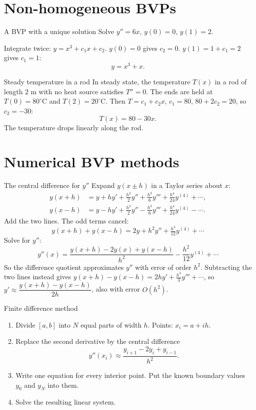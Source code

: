 \section{Non-homogeneous BVPs}

\begin{examplebox}{A BVP with a unique solution}
Solve $y'' = 6x$, \; $y(0)=0$, \; $y(1) = 2$.

Integrate twice: $y = x^3 + c_1x + c_2$. $y(0)=0$ gives $c_2=0$. $y(1)=1 + c_1 = 2$ gives $c_1=1$:
\[ y = x^3 + x. \]
\end{examplebox}

\begin{examplebox}{Steady temperature in a rod}
In steady state, the temperature $T(x)$ in a rod of length $2$ m with no heat source satisfies $T''=0$. The ends are held at $T(0)=80^\circ$C and $T(2) = 20^\circ$C. Then $T = c_1 + c_2x$, $c_1 = 80$, $80 + 2c_2 = 20$, so $c_2=-30$:
\[ T(x) = 80 - 30x . \]
The temperature drops linearly along the rod.
\end{examplebox}

\section{Numerical BVP methods}

\begin{derivbox}{The central difference for $y''$}
Expand $y(x\pm h)$ in a Taylor series about $x$:
\begin{align*}
y(x+h) &= y + hy' + \tfrac{h^2}{2}y'' + \tfrac{h^3}{6}y''' + \tfrac{h^4}{24}y^{(4)} + \cdots,\\
y(x-h) &= y - hy' + \tfrac{h^2}{2}y'' - \tfrac{h^3}{6}y''' + \tfrac{h^4}{24}y^{(4)} - \cdots.
\end{align*}
Add the two lines. The odd terms cancel:
\[ y(x+h) + y(x-h) = 2y + h^2y'' + \tfrac{h^4}{12}y^{(4)} + \cdots \]
Solve for $y''$:
\[ y''(x) = \frac{y(x+h) - 2y(x) + y(x-h)}{h^2} - \frac{h^2}{12}y^{(4)} + \cdots \]
So the difference quotient approximates $y''$ with error of order $h^2$. Subtracting the two lines instead gives $y(x+h) - y(x-h) = 2hy' + \tfrac{h^3}{3}y''' + \cdots$, so $y'\approx\dfrac{y(x+h)-y(x-h)}{2h}$, also with error $O(h^2)$.
\end{derivbox}

\begin{methodbox}{Finite difference method}
\begin{enumerate}
  \item Divide $[a,b]$ into $N$ equal parts of width $h$. Points: $x_i = a + ih$.
  \item Replace the second derivative by the central difference
  \[ y''(x_i) \approx \frac{y_{i+1} - 2y_i + y_{i-1}}{h^2}. \]
  \item Write one equation for every interior point. Put the known boundary values $y_0$ and $y_N$ into them.
  \item Solve the resulting linear system.
\end{enumerate}
\end{methodbox}

